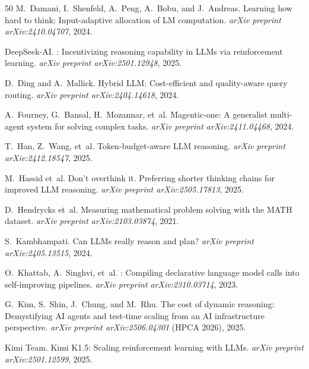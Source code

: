 \documentclass[11pt]{article}
\begin{document}
\begin{thebibliography}{50}
M.~Damani, I.~Shenfeld, A.~Peng, A.~Bobu, and J.~Andreas.
\newblock Learning how hard to think: Input-adaptive allocation of {LM} computation.
\newblock \emph{arXiv preprint arXiv:2410.04707}, 2024.

DeepSeek-AI.
: Incentivizing reasoning capability in {LLMs} via reinforcement learning.
\newblock \emph{arXiv preprint arXiv:2501.12948}, 2025.

D.~Ding and A.~Mallick.
\newblock Hybrid {LLM}: Cost-efficient and quality-aware query routing.
\newblock \emph{arXiv preprint arXiv:2404.14618}, 2024.

A.~Fourney, G.~Bansal, H.~Mozannar, et~al.
\newblock Magentic-one: A generalist multi-agent system for solving complex tasks.
\newblock \emph{arXiv preprint arXiv:2411.04468}, 2024.

T.~Han, Z.~Wang, et~al.
\newblock Token-budget-aware {LLM} reasoning.
\newblock \emph{arXiv preprint arXiv:2412.18547}, 2025.

M.~Hassid et~al.
\newblock Don't overthink it. Preferring shorter thinking chains for improved {LLM} reasoning.
\newblock \emph{arXiv preprint arXiv:2505.17813}, 2025.

D.~Hendrycks et~al.
\newblock Measuring mathematical problem solving with the {MATH} dataset.
\newblock \emph{arXiv preprint arXiv:2103.03874}, 2021.

S.~Kambhampati.
\newblock Can {LLMs} really reason and plan?
\newblock \emph{arXiv preprint arXiv:2405.13515}, 2024.

O.~Khattab, A.~Singhvi, et~al.
: Compiling declarative language model calls into self-improving pipelines.
\newblock \emph{arXiv preprint arXiv:2310.03714}, 2023.

G.~Kim, S.~Shin, J.~Chung, and M.~Rhu.
\newblock The cost of dynamic reasoning: Demystifying {AI} agents and test-time scaling from an {AI} infrastructure perspective.
\newblock \emph{arXiv preprint arXiv:2506.04301} (HPCA 2026), 2025.

Kimi Team.
\newblock Kimi {K1.5}: Scaling reinforcement learning with {LLMs}.
\newblock \emph{arXiv preprint arXiv:2501.12599}, 2025.


\end{thebibliography}
\end{document}
